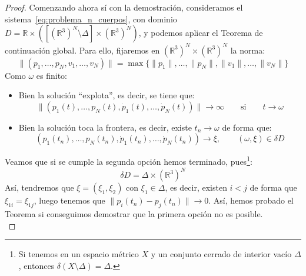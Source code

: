 \begin{teo}
\begin{proof}
        \noindent
        Comenzando ahora sí con la demostración, consideramos el sistema~\ref{eq:problema_n_cuerpos}, con dominio $D = \mathbb{R}\times ([{(\mathbb{R}^3)}^{N}\setminus \Delta]\times {(\mathbb{R}^3)}^{N})$, y podemos aplicar el Teorema de continuación global. Para ello, fijaremos en ${(\mathbb{R}^3)}^{N}\times {(\mathbb{R}^3)}^{N}$ la norma:
        \begin{equation*}
            \|(p_1,\ldots,p_N,v_1,\ldots,v_N)\| = \max\{\|p_1\|, \ldots, \|p_N\|, \|v_1\|,\ldots,\|v_N\|\}
        \end{equation*}
        Como $\omega$ es finito:
        \begin{itemize}
            \item Bien la solución ``explota'', es decir, se tiene que:
                \begin{equation*}
                    \|(p_1(t),\ldots,p_N(t),\dot{p}_1(t),\ldots,\dot{p}_N(t))\| \to \infty \qquad \text{si} \qquad  t\to \omega
                \end{equation*}
            \item Bien la solución toca la frontera, es decir, existe $t_n\to \omega$ de forma que:
                \begin{equation*}
                    (p_1(t_n),\ldots,p_N(t_n),\dot{p}_1(t_n),\ldots,\dot{p}_N(t_n))\to \xi, \qquad (\omega,\xi) \in \delta D
                \end{equation*}
        \end{itemize}
        Veamos que si se cumple la segunda opción hemos terminado, pues\footnote{Si tenemos en un espacio métrico $X$ y un conjunto cerrado de interior vacío $\Delta$, entonces $\delta(X\setminus \Delta) = \Delta$.}:
        \begin{equation*}
            \delta D = \Delta \times {(\mathbb{R}^3)}^{N}
        \end{equation*}
        Así, tendremos que $\xi = (\xi_1,\xi_2)$ con $\xi_1 \in \Delta$, es decir, existen $i<j$ de forma que $\xi_{1i} = \xi_{1j}$, luego tenemos que $\|p_i(t_n) - p_j(t_n)\|\to 0$. Así, hemos probado el Teorema si conseguimos demostrar que la primera opción no es posible.\\


\end{proof}
\end{teo}
